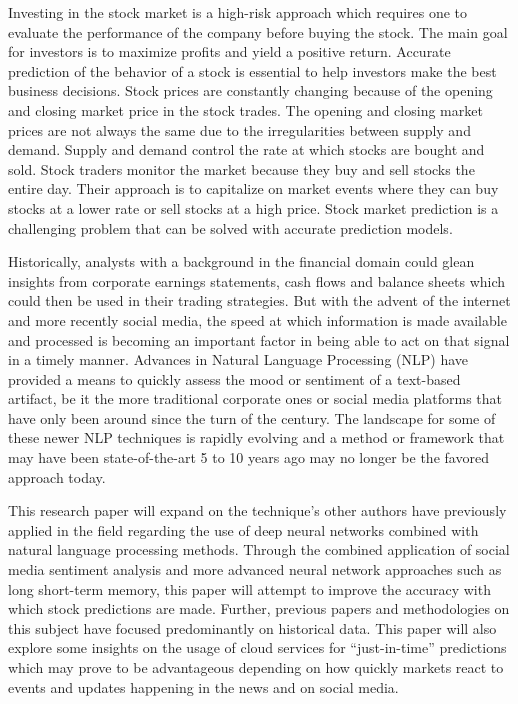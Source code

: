 \documentclass{llncs}
\begin{document}
Investing in the stock market is a high-risk approach which requires one to evaluate the performance of the company before buying the stock. The main goal for investors is to maximize profits and yield a positive return.  Accurate prediction of the behavior of a stock is essential to help investors make the best business decisions.  Stock prices are constantly changing because of the opening and closing market price in the stock trades. The opening and closing market prices are not always the same due to the irregularities between supply and demand. Supply and demand control the rate at which stocks are bought and sold. Stock traders monitor the market because they buy and sell stocks the entire day.  Their approach is to capitalize on market events where they can buy stocks at a lower rate or sell stocks at a high price. Stock market prediction is a challenging problem that can be solved with accurate prediction models. 

Historically, analysts with a background in the financial domain could glean insights from corporate earnings statements, cash flows and balance sheets which could then be used in their trading strategies.  But with the advent of the internet and more recently social media, the speed at which information is made available and processed is becoming an important factor in being able to act on that signal in a timely manner.  Advances in Natural Language Processing (NLP) have provided a means to quickly assess the mood or sentiment of a text-based artifact, be it the more traditional corporate ones or social media platforms that have only been around since the turn of the century.  The landscape for some of these newer NLP techniques is rapidly evolving and a method or framework that may have been state-of-the-art 5 to 10 years ago may no longer be the favored approach today.

This research paper will expand on the technique's other authors have previously applied in the field regarding the use of deep neural networks combined with natural language processing methods. Through the combined application of social media sentiment analysis and more advanced neural network approaches such as long short-term memory, this paper will attempt to improve the accuracy with which stock predictions are made. Further, previous papers and methodologies on this subject have focused predominantly on historical data. This paper will also explore some insights on the usage of cloud services for “just-in-time” predictions which may prove to be advantageous depending on how quickly markets react to events and updates happening in the news and on social media.
\end{document}
